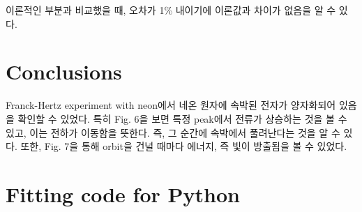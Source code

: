 \documentclass[a4paper, 10pt, nanum]{CSUniSchoolLabReport}
\begin{document}
	\begin{table}[htb!]
		\label{tab:2}
		\centering
		\caption{전하의 흐름이 상승(peak)하는 부분이다.}
	\end{table}

	이론적인 부분과 비교했을 때, 오차가 1\% 내이기에 이론값과 차이가 없음을 알 수 있다.


\section{Conclusions}

	Franck-Hertz experiment with neon에서 네온 원자에 속박된 전자가 양자화되어 있음을 확인할 수 있었다. 특히 Fig. 6을 보면 특정 peak에서 전류가 상승하는 것을 볼 수 있고, 이는 전하가 이동함을 뜻한다. 즉, 그 순간에 속박에서 풀려난다는 것을 알 수 있다. 또한, Fig. 7을 통해 orbit을 건널 때마다 에너지, 즉 빛이 방출됨을 볼 수 있었다.


\section{Fitting code for Python}




\end{document}
